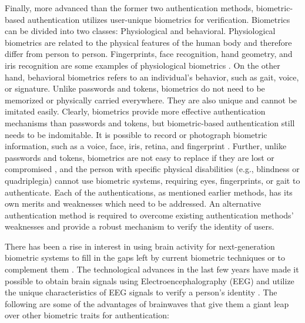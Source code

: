 Finally, more advanced than the former two authentication methods, biometric-based authentication utilizes user-unique biometrics for verification. Biometrics can be divided into two classes: Physiological and behavioral. Physiological biometrics are related to the physical features of the human body and therefore differ from person to person. Fingerprints, face recognition, hand geometry, and iris recognition are some examples of physiological biometrics \cite{bhattacharyya2009biometric}. On the other hand, behavioral biometrics refers to an individual's behavior, such as gait, voice, or signature. Unlike passwords and tokens, biometrics do not need to be memorized or physically carried everywhere. They are also unique and cannot be imitated easily. Clearly, biometrics provide more effective authentication mechanisms than passwords and tokens, but biometric-based authentication still needs to be indomitable.  
It is possible to record or photograph biometric information, such as a voice, face, iris, retina, and fingerprint \cite{authentication_definition}. Further, unlike passwords and tokens, biometrics are not easy to replace if they are lost or compromised \cite{o2003comparing}, and the person with specific physical disabilities (e.g., blindness or quadriplegia) cannot use biometric systems, requiring eyes, fingerprints, or gait to authenticate. Each of the authentications, as mentioned earlier methods, has its own merits and weaknesses which need to be addressed. An alternative authentication method is required to overcome existing authentication methods' weaknesses and provide a robust mechanism to verify the identity of users. \smallskip

There has been a rise in interest in using brain activity for next-generation biometric systems to fill in the gaps left by current biometric techniques or
to complement them \cite{arias2021inexpensive}. The technological advances in the last few years have made it possible to obtain brain signals using Electroencephalography (EEG) and utilize the unique characteristics of EEG signals to verify a person's identity \cite{la2014human}. The following are some of the advantages of brainwaves that give them a giant leap over other biometric traits for authentication:

